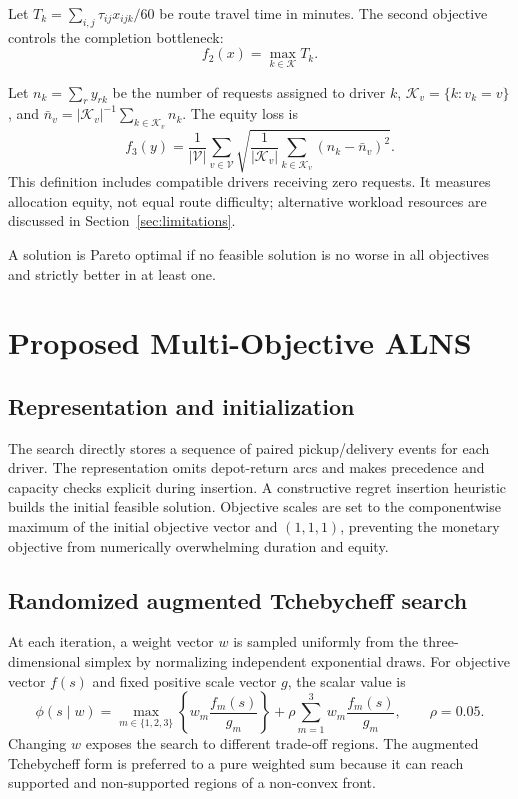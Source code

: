 \documentclass[11pt,a4paper]{article}
\newcommand{\K}{\mathcal{K}}
\newcommand{\V}{\mathcal{V}}
\begin{document}
Let $T_k=\sum_{i,j}\tau_{ij}x_{ijk}/60$ be route travel time in minutes. The second objective controls the completion bottleneck:
\begin{equation}
 f_2(x)=\max_{k\in\K} T_k.
\end{equation}

Let $n_k=\sum_r y_{rk}$ be the number of requests assigned to driver $k$, $\K_v=\{k:v_k=v\}$, and $\bar n_v=|\K_v|^{-1}\sum_{k\in\K_v}n_k$. The equity loss is
\begin{equation}
 f_3(y)=\frac{1}{|\V|}\sum_{v\in\V}
 \sqrt{\frac{1}{|\K_v|}\sum_{k\in\K_v}(n_k-\bar n_v)^2}.
\end{equation}
This definition includes compatible drivers receiving zero requests. It measures allocation equity, not equal route difficulty; alternative workload resources are discussed in Section~\ref{sec:limitations}.

A solution is Pareto optimal if no feasible solution is no worse in all objectives and strictly better in at least one.

\section{Proposed Multi-Objective ALNS}

\subsection{Representation and initialization}

The search directly stores a sequence of paired pickup/delivery events for each driver. The representation omits depot-return arcs and makes precedence and capacity checks explicit during insertion. A constructive regret insertion heuristic builds the initial feasible solution. Objective scales are set to the componentwise maximum of the initial objective vector and $(1,1,1)$, preventing the monetary objective from numerically overwhelming duration and equity.

\subsection{Randomized augmented Tchebycheff search}

At each iteration, a weight vector $w$ is sampled uniformly from the three-dimensional simplex by normalizing independent exponential draws. For objective vector $f(s)$ and fixed positive scale vector $g$, the scalar value is
\begin{equation}
 \phi(s\mid w)=\max_{m\in\{1,2,3\}}\left\{w_m\frac{f_m(s)}{g_m}\right\}
 +\rho\sum_{m=1}^{3}w_m\frac{f_m(s)}{g_m},
 \qquad \rho=0.05.
\end{equation}
Changing $w$ exposes the search to different trade-off regions. The augmented Tchebycheff form is preferred to a pure weighted sum because it can reach supported and non-supported regions of a non-convex front.
\end{document}
